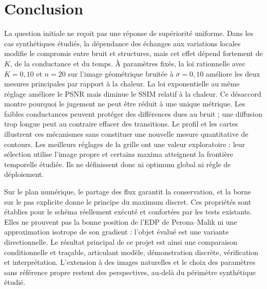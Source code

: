 \section{Conclusion}
\label{sec:conclusion}
La question initiale ne reçoit pas une réponse de supériorité uniforme.
Dans les cas synthétiques étudiés, la dépendance des échanges aux
variations locales modifie le compromis entre bruit et structures,
mais cet effet dépend fortement de $K$, de la conductance et du temps.
À paramètres fixés, la loi rationnelle avec $K=0{,}10$ et $n=20$
sur l'image géométrique bruitée à $\sigma=0{,}10$ améliore les deux
mesures principales par rapport à la chaleur. La loi exponentielle
au même réglage améliore le PSNR mais diminue le SSIM relatif à la
chaleur. Ce désaccord montre pourquoi le jugement ne peut être réduit
à une unique métrique.
Les faibles conductances peuvent protéger des différences dues au
bruit ; une diffusion trop longue peut au contraire effacer des
transitions. Le profil et les cartes illustrent ces mécanismes sans
constituer une nouvelle mesure quantitative de contours. Les meilleurs
réglages de la grille ont une valeur exploratoire : leur sélection
utilise l'image propre et certains maxima atteignent la frontière
temporelle étudiée. Ils ne définissent donc ni optimum global ni
règle de déploiement.

Sur le plan numérique, le partage des flux garantit la conservation,
et la borne sur le pas explicite donne le principe du maximum discret.
Ces propriétés sont établies pour le schéma réellement exécuté et
confortées par les tests existants. Elles ne prouvent pas la bonne
position de l'EDP de Perona--Malik ni une approximation isotrope de
son gradient : l'objet évalué est une variante directionnelle.
Le résultat principal de ce projet est ainsi une comparaison
conditionnelle et traçable, articulant modèle, démonstration discrète,
vérification et interprétation. L'extension à des images naturelles
et le choix des paramètres sans référence propre restent des
perspectives, au-delà du périmètre synthétique étudié.
